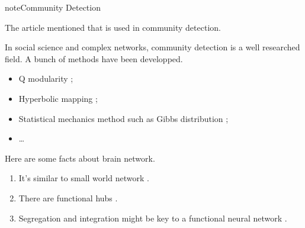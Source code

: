 \documentclass[letterpaper,10pt,english]{sphinxmanual}
\begin{document}
\begin{sphinxadmonition}{note}{Community Detection}

The article \label{\detokenize{neuroscience/functional-connectivity:id2}}{\hyperref[\detokenize{neuroscience/functional-connectivity:brainconnectivity}]{\sphinxcrossref{{[}BrainConnectivity{]}}}} mentioned that  is used in community detection.

In social science and complex networks, community detection is a well researched field. A bunch of methods have been developped.
\begin{itemize}
\item {} 
Q modularity \label{\detokenize{neuroscience/functional-connectivity:id3}}{\hyperref[\detokenize{neuroscience/functional-connectivity:newman2016}]{\sphinxcrossref{{[}Newman2016{]}}}};

\item {} 
Hyperbolic mapping \label{\detokenize{neuroscience/functional-connectivity:id4}}{\hyperref[\detokenize{neuroscience/functional-connectivity:boguna2010}]{\sphinxcrossref{{[}Boguna2010{]}}}};

\item {} 
Statistical mechanics method such as Gibbs distribution \label{\detokenize{neuroscience/functional-connectivity:id5}}{\hyperref[\detokenize{neuroscience/functional-connectivity:zhang2014}]{\sphinxcrossref{{[}Zhang2014{]}}}};

\item {} 
…

\end{itemize}
\end{sphinxadmonition}

Here are some facts about brain network.
\begin{enumerate}
\item {} 
It’s similar to small world network \label{\detokenize{neuroscience/functional-connectivity:id6}}{\hyperref[\detokenize{neuroscience/functional-connectivity:brainconnectivity}]{\sphinxcrossref{{[}BrainConnectivity{]}}}}.

\item {} 
There are functional hubs \label{\detokenize{neuroscience/functional-connectivity:id7}}{\hyperref[\detokenize{neuroscience/functional-connectivity:brainconnectivity}]{\sphinxcrossref{{[}BrainConnectivity{]}}}}.

\item {} 
Segregation and integration might be key to a functional neural network \label{\detokenize{neuroscience/functional-connectivity:id8}}{\hyperref[\detokenize{neuroscience/functional-connectivity:brainconnectivity}]{\sphinxcrossref{{[}BrainConnectivity{]}}}}.

\end{enumerate}
\end{document}
